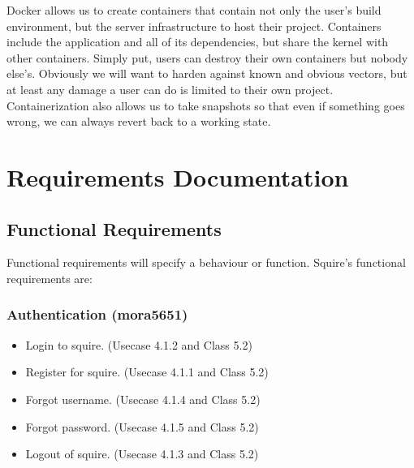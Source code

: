 \documentclass[11pt]{report}
\begin{document}
    Docker allows us to create containers that contain not only the user's build environment, but the server infrastructure to host their project. Containers include the application and all of its dependencies, but share the kernel with other containers. Simply put, users can destroy their own containers but nobody else’s. Obviously we will want to harden against known and obvious vectors, but at least any damage a user can do is limited to their own project. Containerization also allows us to take snapshots so that even if something goes wrong, we can always revert back to a working state.



\chapter{Requirements Documentation}
\section{Functional Requirements}
    Functional requirements will specify a behaviour or function. Squire's functional requirements are:
    \subsection{Authentication (mora5651)}
        \begin{itemize}
            \item Login to squire. (Usecase 4.1.2 and Class 5.2)
            \item Register for squire. (Usecase 4.1.1 and Class 5.2)
            \item Forgot username. (Usecase 4.1.4 and Class 5.2)
            \item Forgot password. (Usecase 4.1.5 and Class 5.2)
            \item Logout of squire. (Usecase 4.1.3 and Class 5.2)
        \end{itemize}
\end{document}
